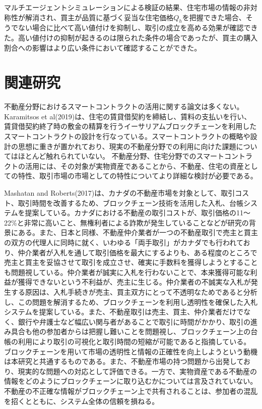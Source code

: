 \documentclass[a4paper,fontsize=11pt,report,notitlepage,line_length=38zw,number_of_lines=40,dvipdfmx]{jlreq}
\begin{document}
マルチエージェントシミュレーションによる検証の結果、住宅市場の情報の非対称性が解消され、買主が品質に基づく妥当な住宅価格$Q_h$を把握できた場合、そうでない場合に比べて高い値付けを抑制し、取引の成立を高める効果が確認できた。高い値付けの抑制が起きるのは限られた条件の場合であったが、買主の購入割合への影響はより広い条件において確認することができた。

\chapter{関連研究}
不動産分野におけるスマートコントラクトの活用に関する論文は多くない。Karamitsos et al(2019)\cite{karamitsos2019}は、住宅の賃貸借契約を締結し、賃料の支払いを行い、賃貸借契約終了時の敷金の精算を行うイーサリアムブロックチェーンを利用したスマートコントラクトの設計を行なっている。スマートコントラクトの概略や設計の思想に重きが置かれており、現実の不動産分野での利用に向けた課題についてはほとんど触れられていない。
不動産分野、住宅分野でのスマートコントラクトの活用には、その対象が実物資産であることから、不動産、住宅の資産としての特性、取引市場の市場としての特性についてより詳細な検討が必要である。

Mashatan and Roberts(2017)\cite{mashatan2017}は、カナダの不動産市場を対象として、取引コスト、取引時間を改善するため、ブロックチェーン技術を活用した入札、台帳システムを提案している。カナダにおける不動産の取引コストが、取引価格の11〜22\%と非常に高いこと、無権利者による詐欺が発生していることなどが研究の背景にある。また、日本と同様、不動産仲介業者が一つの不動産取引で売主と買主の双方の代理人に同時に就く、いわゆる「両手取引」がカナダでも行われており、仲介業者が入札を通して取引価格を最大にするよりも、ある程度のところで売主と買主を妥協させて取引を成立させ、確実に手数料を獲得しようとすることも問題視している。仲介業者が誠実に入札を行わないことで、本来獲得可能な利益が獲得できないという不利益が、売主に生じる。仲介業者の不誠実な入札が発生する原因は、入札手続きが売主、買主双方にとって不透明なためであると分析し、この問題を解消するため、ブロックチェーンを利用し透明性を確保した入札システムを提案している。また、不動産取引は売主、買主、仲介業者だけでなく、銀行や弁護士など幅広い関与者があることで取引に時間がかかり、取引の進み具合も他の参加者からは把握し難いことを問題視し、ブロックチェーン上の台帳の利用により取引の可視化と取引時間の短縮が可能であると指摘している。
ブロックチェーンを用いて市場の透明性と情報の正確性を向上しようという動機は本研究と共通するものである。また、不動産市場の持つ問題から出発しており、現実的な問題への対応として評価できる。一方で、実物資産である不動産の情報をどのようにブロックチェーンに取り込むかについては言及されていない。不動産の不正確な情報がブロックチェーン上で共有されることは、参加者の混乱を招くとともに、システム全体の信頼を損ねる。
\end{document}
